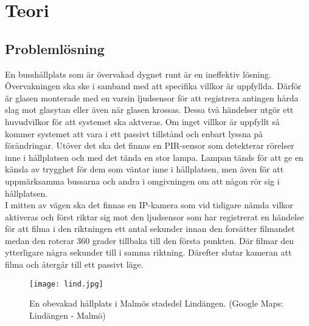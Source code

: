 
\chapter{Teori} %
\label{teori}

\ifpdf
    \graphicspath{{3_theory/figures/PNG/}{3/figures/PDF/}{3/figures/}}
\else
    \graphicspath{{3_theory/figures/EPS/}{3/figures/}}
\fi

\graphicspath{{3_theory/figures/}{3/figures/}}


\section{Problemlösning}

En busshållplats som är övervakad dygnet runt är en ineffektiv lösning. Övervakningen ska ske i samband med att specifika villkor är uppfyllda. Därför är glasen monterade med en varsin ljudsensor för att registrera antingen hårda slag mot glasytan eller även när glasen krossas. Dessa två händelser utgör ett huvudvilkor för att systemet ska aktveras. Om inget villkor är uppfyllt så kommer systemet att vara i ett passivt tillstånd och enbart lyssna på förändringar. Utöver det ska det finnas en PIR-sensor som detekterar rörelser inne i hållplatsen och med det tända en stor lampa. Lampan tänds för att ge en känsla av trygghet för dem som väntar inne i hållplatsen, men även för att uppmärksamma bussarna och andra i omgivningen om att någon rör sig i hållplatsen. \\

I mitten av vägen ska det finnas en IP-kamera som vid tidigare nämda vilkor aktiveras och först riktar sig mot den ljudsensor som har registrerat en händelse för att filma i den riktningen ett antal sekunder innan den forsätter filmandet medan den roterar 360 grader tillbaka till den första punkten. Där filmar den ytterligare några sekunder till i samma riktning. Därefter slutar kameran att filma och återgår till ett passivt läge.

\begin{figure}[h]
  \texttt{[image: lind.jpg]}
  \caption{En obevakad hållplats i Malmös stadsdel Lindängen. (Google Maps: Lindängen - Malmö)}
  \label{fig:lind}
\end{figure}





